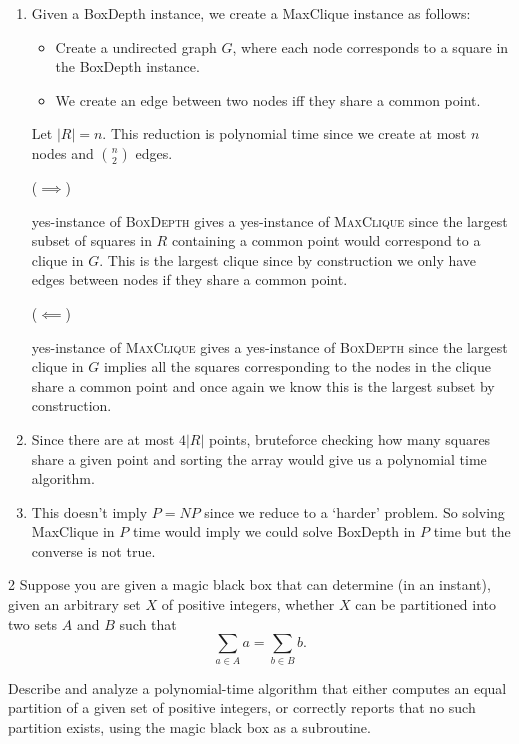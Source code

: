 \documentclass[12pt]{article}
\begin{document}
\begin{solution}
    \bbni
    \begin{enumerate}
        \item Given a BoxDepth instance, we create a MaxClique instance as follows: 
        \begin{itemize}
            \item Create a undirected graph $G$, where each node corresponds to a square in the BoxDepth instance. 
            \item We create an edge between two nodes iff they share a common point. 
        \end{itemize}
        Let $|R| = n$. This reduction is polynomial time since we create at most $n$ nodes and $\binom{n}{2}$ edges. 

        ($\implies$) 

        yes-instance of \textsc{BoxDepth} gives a yes-instance of \textsc{MaxClique} since the largest subset of squares in $R$ containing a common point would correspond to a clique in $G$. This is the largest clique since by construction we only have edges between nodes if they share a common point. 

        ($\impliedby$)
        
        yes-instance of \textsc{MaxClique} gives a yes-instance of \textsc{BoxDepth} since the largest clique in $G$ implies all the squares corresponding to the nodes in the clique share a common point and once again we know this is the largest subset by construction. 
        
        \item Since there are at most $4|R|$ points, bruteforce checking how many squares share a given point and sorting the array would give us a polynomial time algorithm. 
        
        \item This doesn't imply $P = NP$ since we reduce to a `harder' problem. So solving MaxClique in $P$ time would imply we could solve BoxDepth in $P$ time but the converse is not true. 
    \end{enumerate}
\end{solution}

\newpage 

\begin{problem}{2}
    Suppose you are given a magic black box that can determine (in an instant), given an arbitrary set $X$ of positive integers, whether $X$ can be partitioned into two sets $A$ and $B$ such that
    \[
    \sum_{a\in A} a = \sum_{b\in B} b.
    \]

    Describe and analyze a polynomial-time algorithm that either computes an equal partition of a given set of positive integers, or correctly reports that no such partition exists, using the magic black box as a subroutine.
\end{problem}
\end{document}
